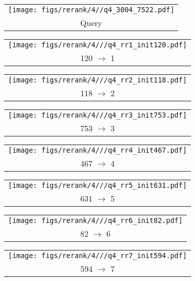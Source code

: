 \begin{figure*}[t]
\begin{tabular}{@{\sssp}c@{\sssp}}\texttt{[image: figs/rerank/4//q4\_3004\_7522.pdf]}\\Query\\ \end{tabular} 
\begin{tabular}{@{\sssp}c@{\sssp}}\texttt{[image: figs/rerank/4///q4\_rr1\_init120.pdf]}\\120 $\rightarrow$ 1\\ \end{tabular} 
\begin{tabular}{@{\sssp}c@{\sssp}}\texttt{[image: figs/rerank/4///q4\_rr2\_init118.pdf]}\\118 $\rightarrow$ 2\\ \end{tabular} 
\begin{tabular}{@{\sssp}c@{\sssp}}\texttt{[image: figs/rerank/4///q4\_rr3\_init753.pdf]}\\753 $\rightarrow$ 3\\ \end{tabular} 
\begin{tabular}{@{\sssp}c@{\sssp}}\texttt{[image: figs/rerank/4///q4\_rr4\_init467.pdf]}\\467 $\rightarrow$ 4\\ \end{tabular} 
\begin{tabular}{@{\sssp}c@{\sssp}}\texttt{[image: figs/rerank/4///q4\_rr5\_init631.pdf]}\\631 $\rightarrow$ 5\\ \end{tabular} 
\begin{tabular}{@{\sssp}c@{\sssp}}\texttt{[image: figs/rerank/4///q4\_rr6\_init82.pdf]}\\82 $\rightarrow$ 6\\ \end{tabular} 
\begin{tabular}{@{\sssp}c@{\sssp}}\texttt{[image: figs/rerank/4///q4\_rr7\_init594.pdf]}\\594 $\rightarrow$ 7\\ \end{tabular} 

  \vspace{2ex}


\end{figure*}
